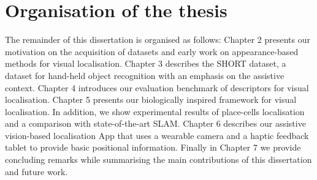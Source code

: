 





\section{Organisation of the thesis}

The remainder of this dissertation is organised as follows: Chapter 2 presents our motivation on the acquisition of datasets and early work on appearance-based methods for visual localisation. Chapter 3 describes the SHORT dataset, a dataset for hand-held object recognition with an emphasis on the assistive context. Chapter 4 introduces our evaluation benchmark of descriptors for visual localisation. Chapter 5 presents our biologically inspired framework for visual localisation. In addition, we show experimental results of place-cells localisation  and a comparison with state-of-the-art SLAM. Chapter 6 describes our assistive vision-based localisation App that uses a wearable camera and a haptic feedback tablet to provide basic positional information. Finally in Chapter 7 we provide concluding remarks while summarising the main contributions of this dissertation and future work.


